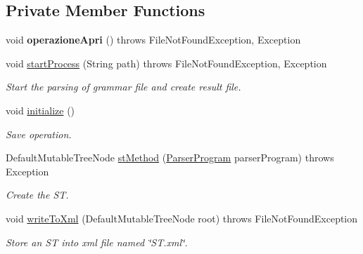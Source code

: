 \subsection*{Private Member Functions}
\begin{DoxyCompactItemize}
\item 
\hypertarget{class_home_gui_a8a91bfb188035012962b468a651f73a5}{void {\bfseries operazione\-Apri} ()  throws File\-Not\-Found\-Exception, Exception }\label{class_home_gui_a8a91bfb188035012962b468a651f73a5}

\item 
void \hyperlink{class_home_gui_a52f0602a97cd1ef63063bbbbda036d26}{start\-Process} (String path)  throws File\-Not\-Found\-Exception, Exception 
\begin{DoxyCompactList}\small\item\em Start the parsing of grammar file and create result file. \end{DoxyCompactList}\item 
void \hyperlink{class_home_gui_a5e935834d62fe14dfda2c9884f1f7010}{initialize} ()
\begin{DoxyCompactList}\small\item\em Save operation. \end{DoxyCompactList}\item 
Default\-Mutable\-Tree\-Node \hyperlink{class_home_gui_a2903109ca5fa51fc78f8487c79dafc43}{st\-Method} (\hyperlink{classparser_program_1_1_parser_program}{Parser\-Program} parser\-Program)  throws Exception 
\begin{DoxyCompactList}\small\item\em Create the S\-T. \end{DoxyCompactList}\item 
void \hyperlink{class_home_gui_a0428d3c56abfafc769684835c1581f38}{write\-To\-Xml} (Default\-Mutable\-Tree\-Node root)  throws File\-Not\-Found\-Exception 
\begin{DoxyCompactList}\small\item\em Store an S\-T into xml file named \char`\"{}\-S\-T.\-xml\char`\"{}. \end{DoxyCompactList}\end{DoxyCompactItemize}
